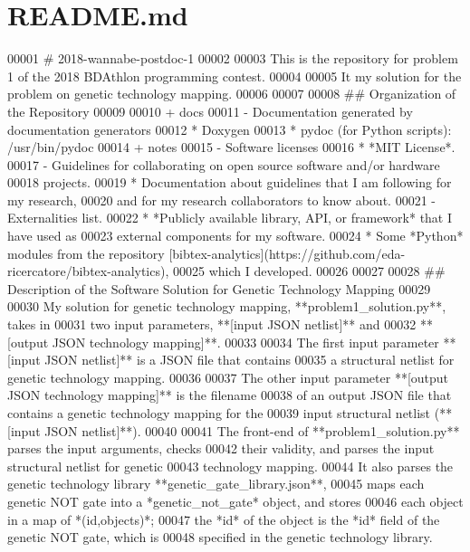 \hypertarget{README_8md_source}{}\section{R\+E\+A\+D\+M\+E.\+md}

\begin{DoxyCode}
00001 # 2018-wannabe-postdoc-1
00002 
00003 This is the repository for problem 1 of the 2018 BDAthlon programming contest.
00004 
00005 It my solution for the problem on genetic technology mapping.
00006 
00007 
00008 ## Organization of the Repository
00009 
00010 + docs
00011    - Documentation generated by documentation generators
00012        * Doxygen
00013        * pydoc (for Python scripts): /usr/bin/pydoc
00014 + notes
00015    - Software licenses
00016        * *MIT License*.
00017    - Guidelines for collaborating on open source software and/or hardware
00018       projects.
00019     * Documentation about guidelines that I am following for my research,
00020          and for my research collaborators to know about.
00021   - Externalities list.
00022     * *Publicly available library, API, or framework* that I have used as
00023         external components for my software.
00024        * Some *Python* modules from the repository
       [bibtex-analytics](https://github.com/eda-ricercatore/bibtex-analytics),
00025            which I developed.
00026 
00027 
00028 ##  Description of the Software Solution for Genetic Technology Mapping
00029 
00030 My solution for genetic technology mapping, **problem1\_solution.py**, takes in
00031    two input parameters, **[input JSON netlist]** and
00032    **[output JSON technology mapping]**.
00033 
00034 The first input parameter **[input JSON netlist]** is a JSON file that contains
00035    a structural netlist for genetic technology mapping.
00036 
00037 The other input parameter **[output JSON technology mapping]** is the filename
00038    of an output JSON file that contains a genetic technology mapping for the
00039    input structural netlist (**[input JSON netlist]**).
00040 
00041 The front-end of **problem1\_solution.py** parses the input arguments, checks
00042    their validity, and parses the input structural netlist for genetic
00043    technology mapping.
00044    It also parses the genetic technology library **genetic\_gate\_library.json**,
00045        maps each genetic NOT gate into a *genetic\_not\_gate* object, and stores
00046        each object in a map of *(id,objects)*;
00047        the *id* of the object is the *id* field of the genetic NOT gate, which is
00048            specified in the genetic technology library.

\end{DoxyCode}
